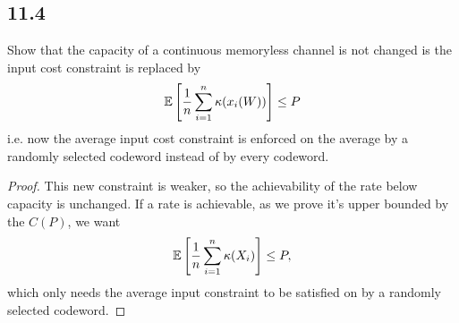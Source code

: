 \documentclass[../main.tex]{subfiles}
\begin{document}
\subsection*{11.4}
Show that the capacity of a continuous memoryless channel is not changed is the input cost constraint is replaced by \begin{align*}
    \mathbb{E}\left[\frac{1}{n}\sum_{i=1}^n\kappa(x_i(W))\right]  \leq P
\end{align*}
i.e. now the average input cost constraint is enforced on the average by a randomly selected codeword instead of by every codeword.
\begin{proof}
    This new constraint is weaker, so the achievability of the rate below capacity is unchanged. If a rate is achievable, as we prove it's upper bounded by the $C(P)$, we want \[
    \mathbb{E} \left[\frac{1}{n}\sum_{i=1}^n\kappa(X_i)\right]\leq P,
    \] which only needs the average input constraint to be satisfied on by a randomly selected codeword.
\end{proof}
\end{document}
